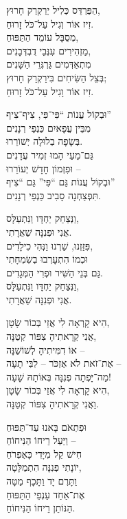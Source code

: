 \documentclass[]{article}
\begin{document}
\begin{multicols}{3}
\begin{displayquote}
			\columnbreak
			הַפַּרְדֵּס כְּלִיל יְרַקְרַק חָרוּץ, \\
			זִיז אוֹר וְגִיל עַל־כֹּל זָרוּחַ. \\
			מְסֻבָּל עוֹמֵד הַתַּפּוּחַ, \\
			מַזְהִירִים עִנְּבֵי דֻבְדְּבָנִים, \\
			מִתְאַדְּמִים גַּרְגְּרֵי הַשָּׁנִים \\
			בְּצֵל הַשִּׂיחִים בִּירַקְרַק חָרוּץ; \\		
			זִיז אוֹר וָגִיל עַל־כֹּל זָרוּחַ. 
			
			וּבְקוֹל עֲנוֹת “פִּי־פִּי, צִיף־צִיף” \\			
			מִבֵּין עֳפָאיִם כַּנְפֵי רְנָנִים \\			
			בְּשָׂפָה בְלוּלָה יְשׁוֹרֵרוּ. \\
			גַּם־מֵעַי הָמוּ זְמִיר עֲדָנִים \\			
			וּפִזְמוֹן חָדָשׁ יְעוֹרֵרוּ – \\
			וּבְקוֹל עֲנוֹת גַּם “פִּי” גַּם “צִיף” \\
			תִּפְצַחְנָה סָבִיב כַּנְפֵי רְנָנִים. 
			
			וַנְּצַחֵק יַחְדָּו וַנִּתְעַלָּס, \\
			אֲנִי וּפְנִנָּה שַׁאֲרָתִי. \\
			פִּזַּזְנוּ, שַׁרְנוּ וַנְּהִי כִילָדִים, \\
			וּכְמוֹ הִתְעָרְבוּ בְשִׂמְחָתִי \\
			גַּם בְּנֵי הַשִּׁיר וּפְרִי הַמְּגָדִים. \\
			וַנְּצַחֵק יַחְדָּו וַנִּתְעַלָּס, \\
			אֲנִי וּפְנִנָּה שַׁאֲרָתִי. 
			
			הִיא קָרְאָה לִי אֲזַי בְּכוֹר שָׂטָן, \\
			אֲנִי קְרָאתִיהָ צִפּוֹר קְטַנָּה,\\
			אוֹ דִמִּיתִיהָ לְשׁוֹשַׁנָּה – \\
			אֶת־זֹאת לֹא אֶזְכֹּר – לִבִּי תָעָה – \\
			מַה־יָּפְתָה פְנִנָּה בְּאוֹתָהּ שָׁעָה! \\
			הִיא קָרְאָה לִי אֲזַי בְּכוֹר שָׂטָן, \\ 
			וַאֲנִי קְרָאתִיהָ צִפּוֹר קְטַנָּה. 
			\columnbreak
			
			וּפִתְאֹם בָּאנוּ עַד־תַּפּוּחַ \\
			וַיַּעַל רֵיחוֹ הַנִּיחוֹחַ – \\
			חִישׁ קַל מִיָּדִי כָּאֶפְרֹחַ \\
			יוֹנָתִי פְנִנָּה הִתְמַלָּטָה, \\
			וַתָּרֶם יָד וַתָּכָף מַטָּה \\
			אֶת־אַחַד עַנְפֵי הַתַּפּוּחַ \\ 
			הַנּוֹתֵן רֵיחוֹ הַנִּיחוֹחַ. 
			

\end{displayquote}
\end{multicols}
\end{document}
